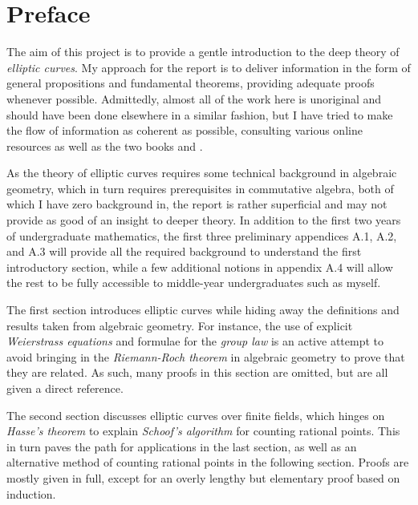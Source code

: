 \documentclass{article}
\theoremstyle{definition}
\begin{document}
\pagebreak

\tableofcontents

\pagebreak

\section*{Preface}

\par

The aim of this project is to provide a gentle introduction to the deep theory of \emph{elliptic curves}. My approach for the report is to deliver information in the form of general propositions and fundamental theorems, providing adequate proofs whenever possible. Admittedly, almost all of the work here is unoriginal and should have been done elsewhere in a similar fashion, but I have tried to make the flow of information as coherent as possible, consulting various online resources as well as the two books \cite{gtm} and \cite{utm}.

As the theory of elliptic curves requires some technical background in algebraic geometry, which in turn requires prerequisites in commutative algebra, both of which I have zero background in, the report is rather superficial and may not provide as good of an insight to deeper theory. In addition to the first two years of undergraduate mathematics, the first three preliminary appendices A.1, A.2, and A.3 will provide all the required background to understand the first introductory section, while a few additional notions in appendix A.4 will allow the rest to be fully accessible to middle-year undergraduates such as myself.

The first section introduces elliptic curves while hiding away the definitions and results taken from algebraic geometry. For instance, the use of explicit \emph{Weierstrass equations} and formulae for the \emph{group law} is an active attempt to avoid bringing in the \emph{Riemann-Roch theorem} in algebraic geometry to prove that they are related. As such, many proofs in this section are omitted, but are all given a direct reference.

The second section discusses elliptic curves over finite fields, which hinges on \emph{Hasse's theorem} to explain \emph{Schoof's algorithm} for counting rational points. This in turn paves the path for applications in the last section, as well as an alternative method of counting rational points in the following section. Proofs are mostly given in full, except for an overly lengthy but elementary proof based on induction.
\end{document}
